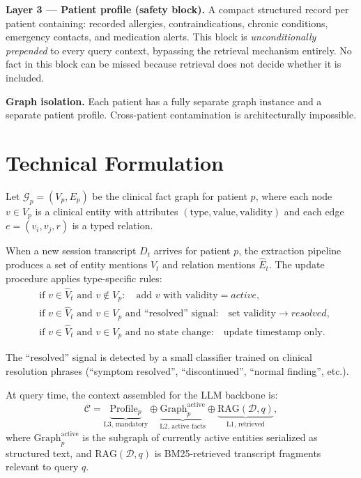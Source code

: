 \documentclass[10pt,twocolumn]{article}
\begin{document}
\textbf{Layer 3 --- Patient profile (safety block).}
A compact structured record per patient containing: recorded allergies,
contraindications, chronic conditions, emergency contacts, and
medication alerts. This block is \emph{unconditionally prepended} to
every query context, bypassing the retrieval mechanism entirely.
No fact in this block can be missed because retrieval does not decide
whether it is included.

\textbf{Graph isolation.} Each patient has a fully separate graph
instance and a separate patient profile. Cross-patient contamination
is architecturally impossible.

\section{Technical Formulation}

Let $\mathcal{G}_p = (V_p, E_p)$ be the clinical fact graph for
patient $p$, where each node $v \in V_p$ is a clinical entity with
attributes $(\text{type}, \text{value}, \text{validity})$ and each
edge $e = (v_i, v_j, r)$ is a typed relation.

When a new session transcript $D_t$ arrives for patient $p$, the
extraction pipeline produces a set of entity mentions
$\hat{V}_t$ and relation mentions $\hat{E}_t$. The update procedure
applies type-specific rules:
\begin{align*}
  &\text{if } v \in \hat{V}_t \text{ and } v \notin V_p:
    \quad \text{add } v \text{ with validity} = \textit{active},\\
  &\text{if } v \in \hat{V}_t \text{ and } v \in V_p
    \text{ and ``resolved'' signal:}
    \quad \text{set validity} \to \textit{resolved},\\
  &\text{if } v \in \hat{V}_t \text{ and } v \in V_p
    \text{ and no state change:}
    \quad \text{update timestamp only}.
\end{align*}

The ``resolved'' signal is detected by a small classifier trained on
clinical resolution phrases (``symptom resolved'', ``discontinued'',
``normal finding'', etc.).

At query time, the context assembled for the LLM backbone is:
\[
  \mathcal{C} = \underbrace{\text{Profile}_p}_{\text{L3, mandatory}}
    \oplus \underbrace{\text{Graph}_p^{\text{active}}}_{\text{L2, active facts}}
    \oplus \underbrace{\text{RAG}(\mathcal{D}, q)}_{\text{L1, retrieved}},
\]
where $\text{Graph}_p^{\text{active}}$ is the subgraph of currently
active entities serialized as structured text, and
$\text{RAG}(\mathcal{D}, q)$ is BM25-retrieved transcript fragments
relevant to query $q$.
\end{document}
